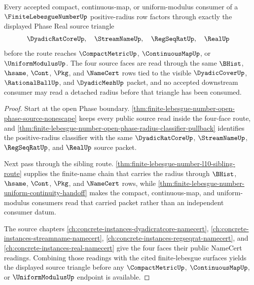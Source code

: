 \begin{theorem}
\label{thm:finite-lebesgue-number-compact-uniform-source-triangle}
Every accepted compact, continuous-map, or uniform-modulus consumer of a $\FiniteLebesgueNumberUp$ positive-radius row factors through exactly the displayed Phase Real source triangle
$$
\begin{gathered}
\DyadicRatCoreUp,\quad \StreamNameUp,\quad \RegSeqRatUp,\quad \RealUp
\end{gathered}
$$
before the route reaches $\CompactMetricUp$, $\ContinuousMapUp$, or $\UniformModulusUp$. The four source faces are read through the same $\BHist$, $\hsame$, $\Cont$, $\Pkg$, and $\NameCert$ rows tied to the visible $\DyadicCoverUp$, $\RationalBallUp$, and $\DyadicMeshUp$ packet, and no accepted downstream consumer may read a detached radius before that triangle has been consumed.
\end{theorem}

\begin{proof}
Start at the open Phase boundary. \autoref{thm:finite-lebesgue-number-open-phase-source-nonescape} keeps every public source read inside the four-face route, and \autoref{thm:finite-lebesgue-number-open-phase-radius-classifier-pullback} identifies the positive-radius classifier with the same $\DyadicRatCoreUp$, $\StreamNameUp$, $\RegSeqRatUp$, and $\RealUp$ source packet.

Next pass through the sibling route. \autoref{thm:finite-lebesgue-number-l10-sibling-route} supplies the finite-name chain that carries the radius through $\BHist$, $\hsame$, $\Cont$, $\Pkg$, and $\NameCert$ rows, while \autoref{thm:finite-lebesgue-number-uniform-continuity-handoff} makes the compact, continuous-map, and uniform-modulus consumers read that carried packet rather than an independent consumer datum.

The source chapters \autoref{ch:concrete-instances-dyadicratcore-namecert}, \autoref{ch:concrete-instances-streamname-namecert}, \autoref{ch:concrete-instances-regseqrat-namecert}, and \autoref{ch:concrete-instances-real-namecert} give the four faces their public NameCert readings. Combining those readings with the cited finite-lebesgue surfaces yields the displayed source triangle before any $\CompactMetricUp$, $\ContinuousMapUp$, or $\UniformModulusUp$ endpoint is available.
\end{proof}

